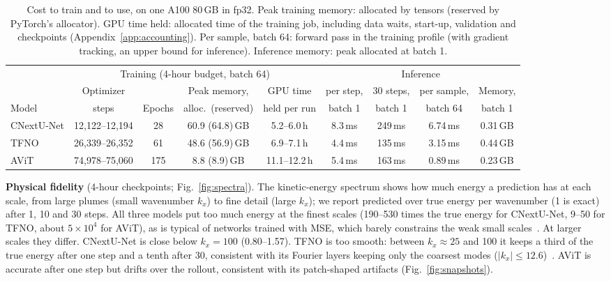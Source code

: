 \documentclass[11pt]{article}
\begin{document}
\begin{table}[!htbp]
\centering\footnotesize
\setlength{\tabcolsep}{4.5pt}
\begin{tabular}{@{}lcccccccc@{}}
\toprule
& \multicolumn{4}{c}{Training (4-hour budget, batch 64)} & \multicolumn{4}{c}{Inference} \\
\cmidrule(lr){2-5}\cmidrule(l){6-9}
& Optimizer & & Peak memory, & GPU time & per step, & 30 steps, & per sample, & Memory, \\
Model & steps & Epochs & alloc.\ (reserved) & held per run & batch 1 & batch 1 & batch 64 & batch 1 \\
\midrule
CNextU-Net & 12,122--12,194 & 28 & 60.9 (64.8)\,GB & 5.2--6.0\,h & 8.3\,ms & 249\,ms & 6.74\,ms & 0.31\,GB \\
TFNO & 26,339--26,352 & 61 & 48.6 (56.9)\,GB & 6.9--7.1\,h & 4.4\,ms & 135\,ms & 3.15\,ms & 0.44\,GB \\
AViT & 74,978--75,060 & 175 & 8.8 (8.9)\,GB & 11.1--12.2\,h & 5.4\,ms & 163\,ms & 0.89\,ms & 0.23\,GB \\
\bottomrule
\end{tabular}
\caption{Cost to train and to use, on one A100 80\,GB in fp32. Peak training memory: allocated by tensors (reserved
by PyTorch's allocator). GPU time held: allocated time of the training job, including data waits, start-up,
validation and checkpoints (Appendix~\ref{app:accounting}). Per sample, batch 64: forward pass in the training
profile (with gradient tracking, an upper bound for inference). Inference memory: peak allocated at batch 1.}
\label{tab:resources}
\end{table}

\newpage
\textbf{Physical fidelity} (4-hour checkpoints; Fig.~\ref{fig:spectra}). The kinetic-energy spectrum shows how much
energy a prediction has at each scale, from large plumes (small wavenumber $k_x$) to fine detail (large $k_x$); we
report predicted over true energy per wavenumber (1 is exact) after 1, 10 and 30 steps. All three models put too
much energy at the finest scales (190--530 times the true energy for CNextU-Net, 9--50 for TFNO, about $5\times10^4$
for AViT), as is typical of networks trained with MSE, which barely constrains the weak small
scales~\cite{rahaman2019spectral,lippe2023pderefiner}. At larger scales they differ. CNextU-Net is close below
$k_x=100$ (0.80--1.57). TFNO is too smooth: between $k_x\approx25$ and 100 it keeps a third of the true energy after
one step and a tenth after 30, consistent with its Fourier layers keeping only the coarsest modes
($|k_x|\le12.6$)~\cite{li2021fno}. AViT is accurate after one step but drifts over the rollout, consistent with its
patch-shaped artifacts (Fig.~\ref{fig:snapshots}).
\end{document}
